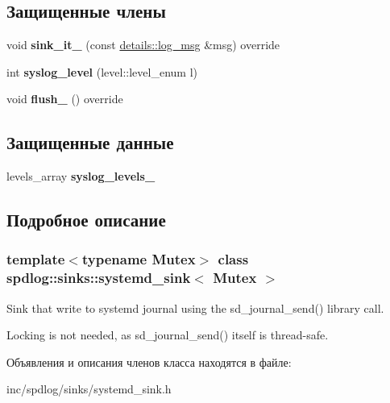 \subsection*{Защищенные члены}
\begin{DoxyCompactItemize}
\item 
\mbox{\label{classspdlog_1_1sinks_1_1systemd__sink_a90fe52782d60b582ca21cad93b7df843}} 
void {\bfseries sink\+\_\+it\+\_\+} (const \hyperlink{structspdlog_1_1details_1_1log__msg}{details\+::log\+\_\+msg} \&msg) override
\item 
\mbox{\label{classspdlog_1_1sinks_1_1systemd__sink_a29e942c5d7b3be09d515f6806cff9063}} 
int {\bfseries syslog\+\_\+level} (level\+::level\+\_\+enum l)
\item 
\mbox{\label{classspdlog_1_1sinks_1_1systemd__sink_a017478cdcc1e751a502ebfe0ba55e6c6}} 
void {\bfseries flush\+\_\+} () override
\end{DoxyCompactItemize}
\subsection*{Защищенные данные}
\begin{DoxyCompactItemize}
\item 
\mbox{\label{classspdlog_1_1sinks_1_1systemd__sink_a044b037c7f79f073741affdabef4c2d8}} 
levels\+\_\+array {\bfseries syslog\+\_\+levels\+\_\+}
\end{DoxyCompactItemize}


\subsection{Подробное описание}
\subsubsection*{template$<$typename Mutex$>$\newline
class spdlog\+::sinks\+::systemd\+\_\+sink$<$ Mutex $>$}

Sink that write to systemd journal using the {\ttfamily sd\+\_\+journal\+\_\+send()} library call.

Locking is not needed, as {\ttfamily sd\+\_\+journal\+\_\+send()} itself is thread-\/safe. 

Объявления и описания членов класса находятся в файле\+:\begin{DoxyCompactItemize}
\item 
inc/spdlog/sinks/systemd\+\_\+sink.\+h\end{DoxyCompactItemize}
